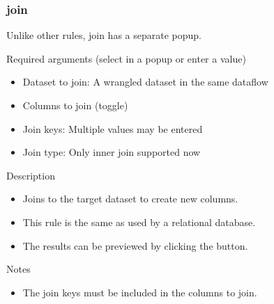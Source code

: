 \documentclass[letterpaper,10pt,english]{sphinxmanual}
\begin{document}
\subsubsection{join}
\label{\detokenize{discovery/part07/rule_kinds:join}}
\begin{figure}[H]
\centering

\noindent{}
\end{figure}

Unlike other rules, join has a separate popup.

Required arguments (select in a popup or enter a value)
\begin{itemize}
\item {} 
Dataset to join: A wrangled dataset in the same dataflow

\item {} 
Columns to join (toggle)

\item {} 
Join keys: Multiple values may be entered

\item {} 
Join type: Only inner join supported now

\end{itemize}

Description
\begin{itemize}
\item {} 
Joins to the target dataset to create new columns.

\item {} 
This rule is the same as  used by a relational database.

\item {} 
The results can be previewed by clicking the  button.

\end{itemize}

Notes
\begin{itemize}
\item {} 
The join keys must be included in the columns to join.
\begin{quote}

\begin{figure}[H]
\centering

\noindent{}
\end{figure}
\end{quote}

\end{itemize}
\end{document}
